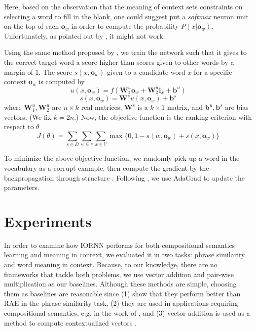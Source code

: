 \documentclass[11pt]{article}
\begin{document}
Here, based on the observation that the meaning of context sets constraints on 
selecting a word to fill in the blank, one could suggest put a \textit{softmax} neuron 
unit on the top of each $\mathbf{o}_w$ in order to compute the probability $P(x|\mathbf{o}_w)$. 
Unfortunately, as pointed out by , it might not work. 

Using the same method proposed by , we train the network 
such that it gives to the correct target word a score higher than scores given to other words
by a margin of 1. 
The score $s(x,\mathbf{o}_w)$ given to a candidate word $x$ for a specific context 
$\mathbf{o}_w$ is computed by 
\begin{equation}
	u(x,\mathbf{o}_w) = f(\mathbf{W}^u_1 \mathbf{o}_w + \mathbf{W}^u_2 \mathbf{i}_x + \mathbf{b}^u) 
\end{equation}
\begin{equation}
	\label{equation score}
	s(x,\mathbf{o}_w) = \mathbf{W}^s u(x,\mathbf{o}_w) + \mathbf{b}^s
\end{equation}
where $\mathbf{W}_1^u,\mathbf{W}_2^u$ are $n \times k$ real matrices, $ \mathbf{W}^s$ is 
a $k \times 1$ matrix, and $\mathbf{b}^u, \mathbf{b}^s$ are bias vectors. (We fix $k=2n$.) 
Now, the objective function is the ranking criterion with respect to $\theta$
\begin{equation}
	J(\theta) = \sum_{s \in D} \sum_{w \in s} \sum_{x \in V} \max \{0, 1 - s(w,\mathbf{o}_w) + s(x,\mathbf{o}_w) \}
\end{equation}

To minimize the above objective function, we randomly pick up a word 
in the vocabulary as a corrupt example, then compute the gradient by the 
backpropagation through structure \cite{goller_learning_1996}. 
Following , we use AdaGrad \cite{duchi2011adaptive}
to update the parameters.


\section{Experiments}
\label{section experiments}

In order to examine how IORNN performs for both compositional semantics learning and 
meaning in context, we evaluated it in two tasks: phrase similarity and 
word meaning in context. Because, to our knowledge, there are no frameworks 
that tackle both problems, we use vector addition and pair-wise multiplication 
as our baselines. Although these methods are simple, choosing them as baselines 
are reasonable since (1)  show that they perform better than RAE in the 
phrase similarity task, (2) they are used in applications requiring 
compositional semantics, e.g. in the work of , 
and (3) vector addition is used as a method to compute contextualized vectors \cite{thater2011word}.
\end{document}
